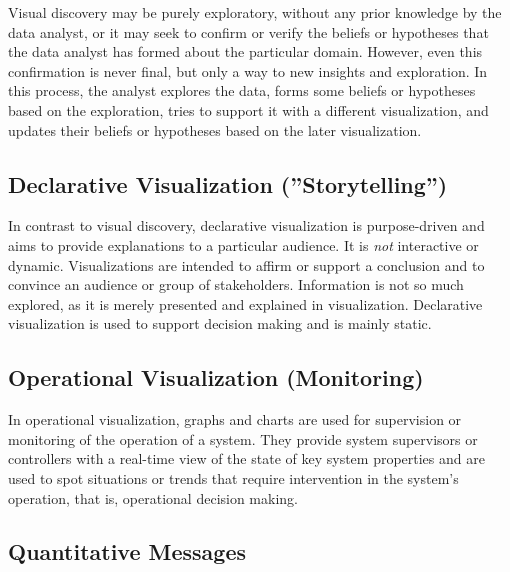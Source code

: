 Visual discovery may be purely exploratory, without any prior knowledge by the data analyst, or it may seek to confirm or verify the beliefs or hypotheses that the data analyst has formed about the particular domain. However, even this confirmation is never final, but only a way to new insights and exploration. In this process, the analyst explores the data, forms some beliefs or hypotheses based on the exploration, tries to support it with a different visualization, and updates their beliefs or hypotheses based on the later visualization.

\subsection*{Declarative Visualization (''Storytelling'')}

In contrast to visual discovery, declarative visualization is purpose-driven and aims to provide explanations to a particular audience. It is \emph{not} interactive or dynamic. Visualizations are intended to affirm or support a conclusion and to convince an audience or group of stakeholders. Information is not so much explored, as it is merely presented and explained in visualization. Declarative visualization is used to support decision making and is mainly static. 

\subsection*{Operational Visualization (Monitoring)}

In operational visualization, graphs and charts are used for supervision or monitoring of the operation of a system. They provide system supervisors or controllers with a real-time view of the state of key system properties and are used to spot situations or trends that require intervention in the system's operation, that is, operational decision making. 

\subsection*{Quantitative Messages} 

